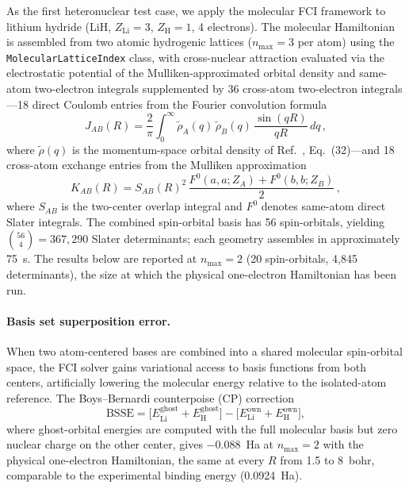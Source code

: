 \documentclass[aps,pra,twocolumn,superscriptaddress,longbibliography,floatfix]{revtex4-2}
\begin{document}
As the first heteronuclear test case, we apply the molecular FCI framework
to lithium hydride (LiH, $Z_{\text{Li}}=3$, $Z_{\text{H}}=1$, 4 electrons).
The molecular Hamiltonian is assembled from two atomic hydrogenic lattices
($n_{\max}=3$ per atom) using the \texttt{MolecularLatticeIndex} class,
with cross-nuclear attraction evaluated via the electrostatic potential of
the Mulliken-approximated orbital density and same-atom two-electron
integrals supplemented by 36 cross-atom two-electron integrals---18
direct Coulomb entries from the Fourier convolution formula
\begin{equation}
J_{AB}(R) = \frac{2}{\pi} \int_0^\infty
\tilde{\rho}_A(q)\,\tilde{\rho}_B(q)\,
\frac{\sin(qR)}{qR}\,dq\,,
\label{eq:jab}
\end{equation}
where $\tilde{\rho}(q)$ is the momentum-space orbital density of
Ref.~\cite{Loutey2026c}, Eq.~(32)---and 18 cross-atom exchange entries
from the Mulliken approximation
\begin{equation}
K_{AB}(R) = S_{AB}(R)^2 \,\frac{F^0(a,a;Z_A) + F^0(b,b;Z_B)}{2}\,,
\label{eq:kab}
\end{equation}
where $S_{AB}$ is the two-center overlap integral and $F^0$ denotes
same-atom direct Slater integrals.
The combined spin-orbital basis has 56 spin-orbitals, yielding
$\binom{56}{4} = 367{,}290$ Slater determinants; each geometry assembles
in approximately 75~s.  The results below are reported at $n_{\max}=2$
(20 spin-orbitals, 4{,}845 determinants), the size at which the physical
one-electron Hamiltonian has been run.

\paragraph{Basis set superposition error.}
When two atom-centered bases are combined into a shared molecular
spin-orbital space, the FCI solver gains variational access to basis
functions from both centers, artificially lowering the molecular energy
relative to the isolated-atom reference. The Boys--Bernardi
counterpoise (CP) correction~\cite{Boys1970}
\begin{equation}
\text{BSSE} = \bigl[E_{\text{Li}}^{\text{ghost}}
+ E_{\text{H}}^{\text{ghost}}\bigr]
- \bigl[E_{\text{Li}}^{\text{own}}
+ E_{\text{H}}^{\text{own}}\bigr],
\label{eq:bsse}
\end{equation}
where ghost-orbital energies are computed with the full molecular basis
but zero nuclear charge on the other center, gives $-0.088$~Ha at
$n_{\max}=2$ with the physical one-electron Hamiltonian, the same at
every $R$ from 1.5 to 8~bohr, comparable to
the experimental binding energy (0.0924~Ha).
\end{document}
